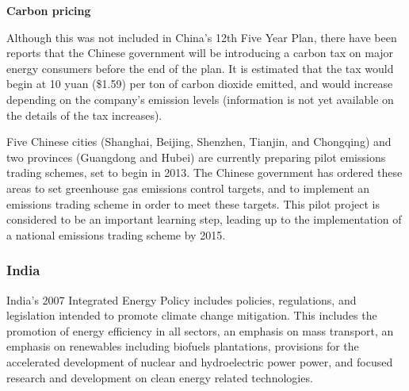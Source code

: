 \textbf{Carbon pricing}



Although this was not included in China's 12th Five Year Plan, there have been reports that the Chinese government will be introducing a carbon tax on major energy consumers before the end of the plan. 
It is estimated that the tax would begin at 10 yuan (\$1.59) per ton of carbon dioxide emitted, and would increase depending on the company’s emission levels (information is not yet available on the details of the tax increases).



Five Chinese cities (Shanghai, Beijing, Shenzhen, Tianjin, and Chongqing) and two provinces (Guangdong and Hubei) are currently preparing pilot emissions trading schemes, set to begin in 2013. 
The Chinese government has ordered these areas to set greenhouse gas emissions control targets, and to implement an emissions trading scheme in order to meet these targets. 
This pilot project is considered to be an important learning step, leading up to the implementation of a national emissions trading scheme by 2015.



	\subsubsection{India}






India's 2007 Integrated Energy Policy includes policies, regulations, and legislation intended to promote climate change mitigation.
This includes the promotion of energy efficiency in all sectors, an emphasis on mass transport, an emphasis on renewables including biofuels plantations, provisions for the accelerated development of nuclear and hydroelectric power power, and focused research and development on clean energy related technologies.





